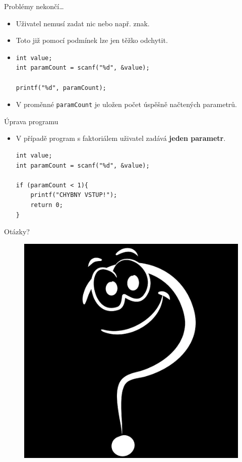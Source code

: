 \documentclass[14pt,aspectratio=169]{beamer}
\begin{document}
    \begin{frame}[t,fragile]{Problémy nekončí\dots}
        \begin{itemize}
            \item Uživatel nemusí zadat nic nebo např. znak.
            \item Toto již pomocí podmínek lze jen těžko odchytit. 
            \item {}
            \begin{lstlisting}
int value;
int paramCount = scanf("%d", &value);

printf("%d", paramCount);
            \end{lstlisting}
            \item V proměnné \texttt{paramCount} je uložen počet úspěšně načtených parametrů.
        \end{itemize}
    \end{frame}

    \begin{frame}[t,fragile]{Úprava programu}
        \begin{itemize}
            \item V případě program s faktoriálem uživatel zadává \textbf{jeden parametr}.
            \begin{lstlisting}
int value;
int paramCount = scanf("%d", &value);

if (paramCount < 1){
    printf("CHYBNY VSTUP!");
    return 0;
}
            \end{lstlisting}
        \end{itemize}
    \end{frame}

    \begin{frame}{Otázky?}
        \begin{figure}
            \centering
            \includegraphics[scale=.4]{images/discussion_inverted.png}
        \end{figure}
    \end{frame}
\end{document}
